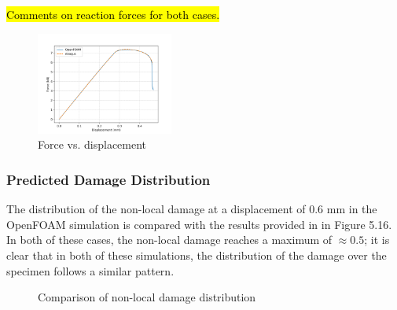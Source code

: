 \documentclass[sn-mathphys,Numbered,draft]{sn-jnl}%
\begin{document}
\hl{Comments on reaction forces for both cases.}

\begin{figure}[htb]
\begin{center}
	\includegraphics[width=0.4\textwidth]{./Figures/LemaitreCompare/borden/bordenDispForce.png}
\caption{Force vs. displacement}
\label{fig:notchedRoundBAr}
\end{center}
\end{figure}



\subsubsection{Predicted Damage Distribution}
The distribution of the non-local damage at a displacement of $0.6$ mm in the OpenFOAM simulation is compared with the results provided in \citet{cesar_de_sa_damage_2006} in Figure 5.16. In both of these cases, the non-local damage reaches a maximum of $\approx0.5$; it is clear that in both of these simulations, the distribution of the damage over the specimen follows a similar pattern.

\begin{figure}[htbp]
	\centering
		\qquad
		
		\caption{Comparison of non-local damage distribution}
	\label{label_for_entire_figure}
\end{figure}
\FloatBarrier
\end{document}
